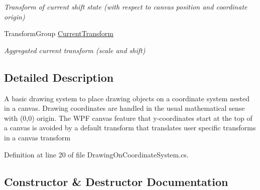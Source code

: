 \begin{DoxyCompactItemize}
\begin{DoxyCompactList}\small\item\em Transform of current shift state (with respect to canvas position and coordinate origin) \end{DoxyCompactList}\item 
Transform\+Group \hyperlink{class_w_p_f_visualization_base_1_1_drawing_on_coordinate_system_a42adb02df11d5d052de3223a4d951343}{Current\+Transform}
\begin{DoxyCompactList}\small\item\em Aggregated current transform (scale and shift) \end{DoxyCompactList}\end{DoxyCompactItemize}


\subsection{Detailed Description}
A basic drawing system to place drawing objects on a coordinate system nested in a canvas. Drawing coordinates are handled in the usual mathematical sense with (0,0) origin. The W\+PF canvas feature that y-\/coordinates start at the top of a canvas is avoided by a default transform that translates user specific transforms in a canvas transform 



Definition at line 20 of file Drawing\+On\+Coordinate\+System.\+cs.



\subsection{Constructor \& Destructor Documentation}

